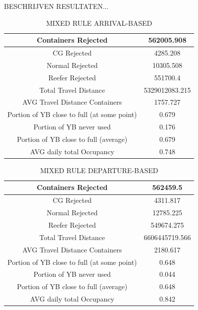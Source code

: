 \documentclass{article}
\begin{document}
BESCHRIJVEN RESULTATEN...

\begin{table}[h]
    \centering
    \begin{tabular}{|c|c|}
        \hline
        Containers Rejected                         & 562005.908     \\ \hline
        CG Rejected                                 & 4285.208       \\ \hline
        Normal Rejected                             & 10305.508      \\ \hline
        Reefer Rejected                             & 551700.4       \\ \hline
        Total Travel Distance                       & 5329012083.215 \\ \hline
        AVG Travel Distance Containers              & 1757.727       \\ \hline
        Portion of YB close to full (at some point) & 0.679          \\ \hline
        Portion of YB never used                    & 0.176          \\ \hline
        Portion of YB close to full (average)       & 0.679          \\ \hline
        AVG daily total Occupancy                   & 0.748          \\ \hline
    \end{tabular}
    \caption{MIXED RULE ARRIVAL-BASED}
\end{table}

\begin{table}[h]
    \centering
    \begin{tabular}{|c|c|}
        \hline
        Containers Rejected                         & 562459.5       \\ \hline
        CG Rejected                                 & 4311.817       \\ \hline
        Normal Rejected                             & 12785.225      \\ \hline
        Reefer Rejected                             & 549674.275     \\ \hline
        Total Travel Distance                       & 6606445719.566 \\ \hline
        AVG Travel Distance Containers              & 2180.617       \\ \hline
        Portion of YB close to full (at some point) & 0.648          \\ \hline
        Portion of YB never used                    & 0.044          \\ \hline
        Portion of YB close to full (average)       & 0.648          \\ \hline
        AVG daily total Occupancy                   & 0.842          \\ \hline
    \end{tabular}
    \caption{MIXED RULE DEPARTURE-BASED}
\end{table}
\end{document}
